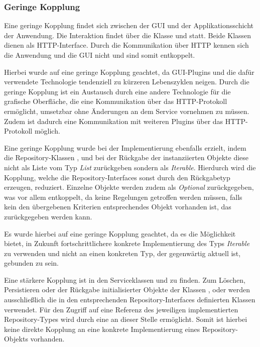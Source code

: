 \subsubsection*{Geringe Kopplung}
Eine geringe Kopplung findet sich zwischen der \ac{GUI} und der Applikationsschicht der Anwendung.
Die Interaktion findet über die Klasse \href{}{} und \href{}{} statt.
Beide Klassen dienen als \ac{HTTP}-Interface.
Durch die Kommunikation über \ac{HTTP} kennen sich die Anwendung und die \ac{GUI} nicht und sind somit entkoppelt.

Hierbei wurde auf eine geringe Kopplung geachtet, da \ac{GUI}-Plugins und die dafür verwendete Technologie tendenziell zu kürzeren Lebenszyklen neigen.
Durch die geringe Kopplung ist ein Austausch durch eine andere Technologie für die grafische Oberfläche, die eine Kommunikation über das \ac{HTTP}-Protokoll ermöglicht, umsetzbar ohne Änderungen an dem Service vornehmen zu müssen.
Zudem ist dadurch eine Kommunikation mit weiteren Plugins über das \ac{HTTP}-Protokoll möglich.

Eine geringe Kopplung wurde bei der Implementierung ebenfalls erzielt, indem die Repository-Klassen \href{}{}, \href{}{} und \href{}{} bei der Rückgabe der instanziierten Objekte diese nicht als Liste vom Typ \textit{List} zurückgeben sondern als \textit{Iterable}.
Hierdurch wird die Kopplung, welche die Repository-Interfaces sonst durch den Rückgabetyp erzeugen, reduziert.
Einzelne Objekte werden zudem als \textit{Optional} zurückgegeben, was vor allem entkoppelt, da keine Regelungen getroffen werden müssen, falls kein den übergebenen Kriterien entsprechendes Objekt vorhanden ist, das zurückgegeben werden kann.

Es wurde hierbei auf eine geringe Kopplung geachtet, da es die Möglichkeit bietet, in Zukunft fortschrittlichere konkrete Implementierung des Typs \textit{Iterable} zu verwenden und nicht an einen konkreten Typ, der gegenwärtig aktuell ist, gebunden zu sein.

Eine stärkere Kopplung ist in den Serviceklassen \href{}{} und \href{}{} zu finden.
Zum Löschen, Persistieren oder der Rückgabe initialisierter Objekte der Klassen \href{}{}, \href{}{} oder \href{}{} werden ausschließlich die in den entsprechenden Repository-Interfaces definierten Klassen verwendet.
Für den Zugriff auf eine Referenz des jeweiligen implementierten Repository-Types wird durch eine \href{}{} an dieser Stelle ermöglicht.
Somit ist hierbei keine direkte Kopplung an eine konkrete Implementierung eines Repository-Objekts vorhanden.

